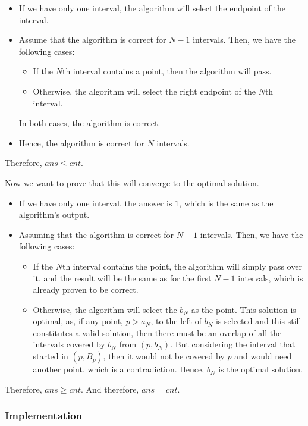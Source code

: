 \documentclass{article}
\begin{document}
\begin{itemize}
    \item If we have only one interval, the algorithm will select the endpoint of the interval.
    \item Assume that the algorithm is correct for $N-1$ intervals. Then, we have the following cases:
          \begin{itemize}
              \item If the $N$th interval contains a point, then the algorithm will pass.
              \item Otherwise, the algorithm will select the right endpoint of the $N$th interval.
          \end{itemize}
          In both cases, the algorithm is correct.
    \item Hence, the algorithm is correct for $N$ intervals.
\end{itemize}

Therefore, $ans \le cnt$.

Now we want to prove that this will converge to the optimal solution.

\begin{itemize}
    \item If we have only one interval, the answer is $1$, which is the same as the algorithm's output.
    \item Assuming that the algorithm is correct for $N-1$ intervals. Then, we have the following cases:
          \begin{itemize}
              \item If the $N$th interval contains the point, the algorithm will simply pass over it, and the result will be the same as for the first $N-1$ intervals, which is already proven to be correct.
              \item Otherwise, the algorithm will select the $b_N$ as the point. This solution is optimal, as, if any point, $p > a_N$, to the left of $b_N$ is selected and this still constitutes a valid solution, then there must be an overlap of all the intervals covered by $b_N$ from $(p, b_N)$. But considering the interval that started in $(p, B_p)$, then it would not be covered by $p$ and would need another point, which is a contradiction. Hence, $b_N$ is the optimal solution.
          \end{itemize}
\end{itemize}

Therefore, $ans \ge cnt$. And therefore, $ans = cnt$.

\subsubsection{Implementation}
\end{document}
